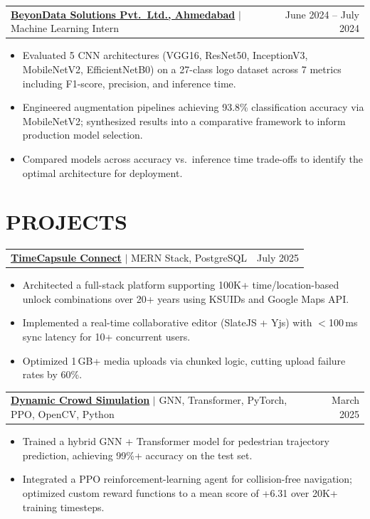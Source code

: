 \documentclass[11pt,letterpaper]{article}
\makeatletter
\newcommand{\entry}[3]{%
  \vspace{4pt}
  \noindent
  \begin{tabular*}{\textwidth}{@{}l@{\extracolsep{\fill}}r@{}}
    \textbf{#1} $|$ {\small #2} & {\small #3}
  \end{tabular*}%
  \vspace{-2pt}
}
\makeatother
\begin{document}
\entry{\href{https://drive.google.com/file/d/1rQO-Fs9KFXLt9pom74eG1ied6ylTrGkD/view?usp=drive_link}{BeyonData Solutions Pvt.\ Ltd., Ahmedabad}}{Machine Learning Intern}{June 2024 -- July 2024}
\begin{itemize}
  \item Evaluated 5 CNN architectures (VGG16, ResNet50, InceptionV3, MobileNetV2, EfficientNetB0) on a 27-class logo dataset across 7 metrics including F1-score, precision, and inference time.
  \item Engineered augmentation pipelines achieving 93.8\% classification accuracy via MobileNetV2; synthesized results into a comparative framework to inform production model selection.
  \item Compared models across accuracy vs.\ inference time trade-offs to identify the optimal architecture for deployment.
\end{itemize}

\section{PROJECTS}

\entry{\href{https://timecapsule-connect-1.onrender.com}{TimeCapsule Connect}}{MERN Stack, PostgreSQL}{July 2025}
\begin{itemize}
  \item Architected a full-stack platform supporting 100K+ time/location-based unlock combinations over 20+ years using KSUIDs and Google Maps API.
  \item Implemented a real-time collaborative editor (SlateJS + Yjs) with $<$100\,ms sync latency for 10+ concurrent users.
  \item Optimized 1\,GB+ media uploads via chunked logic, cutting upload failure rates by 60\%.
\end{itemize}

\entry{\href{https://github.com/Subhronilmukhopadhyay/Dynamic-Crowd-Simulation-with-Realistic-Behavior-Modeling}{Dynamic Crowd Simulation}}{GNN, Transformer, PyTorch, PPO, OpenCV, Python}{March 2025}
\begin{itemize}
  \item Trained a hybrid GNN + Transformer model for pedestrian trajectory prediction, achieving 99\%+ accuracy on the test set.
  \item Integrated a PPO reinforcement-learning agent for collision-free navigation; optimized custom reward functions to a mean score of +6.31 over 20K+ training timesteps.
\end{itemize}
\end{document}
